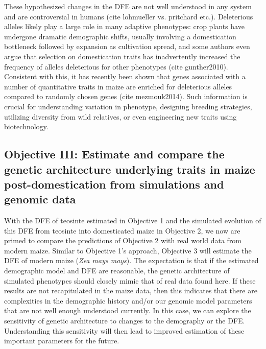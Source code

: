  These hypothesized changes in the DFE are not well understood in any system and are controversial in humans (cite lohmueller vs. pritchard etc.). Deleterious alleles likely play a large role in many adaptive phenotypes: crop plants have undergone dramatic demographic shifts, usually involving a domestication bottleneck followed by expansion as cultivation spread, and some authors even argue that selection on domestication traits has inadvertently increased the frequency of alleles deleterious for other phenotypes (cite gunther2010). Consistent with this, it has recently been shown that genes associated with a number of quantitative traits in maize are enriched for deleterious alleles compared to randomly chosen genes (cite mezmouk2014). Such information is crucial for understanding variation in phenotype, designing breeding strategies, utilizing diversity from wild relatives, or even engineering new traits using biotechnology. 




\subsection*{Objective III: Estimate and compare the genetic architecture underlying traits in maize post-domestication from simulations and genomic data} 

With the DFE of teosinte estimated in Objective 1 and the simulated evolution of this DFE from teosinte into domesticated maize in Objective 2, we now are primed to compare the predictions of Objective 2 with real world data from modern maize. Similar to Objective 1's approach, Objective 3 will estimate the DFE of modern maize (\emph{Zea mays mays}). The expectation is that if the estimated demographic model and DFE are reasonable, the genetic architecture of simulated phenotypes should closely mimic that of real data found here. If these results are not recapitulated in the maize data, then this indicates that there are complexities in the demographic history and\//or our genomic model parameters that are not well enough understood currently. In this case, we can explore the sensitivity of genetic architecture to changes to the demography or the DFE. Understanding this sensitivity will then lead to improved estimation of these important parameters for the future.

